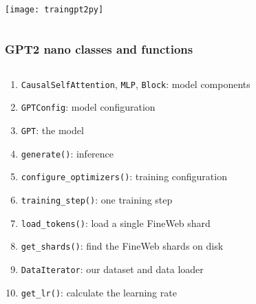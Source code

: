 \documentclass[
	notes=none,
	aspectratio=169
]{beamer}
\begin{document}

\begin{frame}
\frametitle{}

\begin{columns}[T]
\begin{column}[T]{1.0\textwidth}
\setlength{\parskip}{0.5em}

\vspace{0.0cm}
\texttt{[image: traingpt2py]}


\end{column}
\end{columns}

\end{frame}
\note{
}


\begin{frame}
\frametitle{GPT2 nano classes and functions}

\begin{columns}[T]
\begin{column}[T]{1.0\textwidth}
\setlength{\parskip}{0.5em}

\vspace{0.0cm}
\begin{enumerate}
\setlength{\parskip}{0.0em}
\item {\tt CausalSelfAttention}, {\tt MLP}, {\tt Block}: model components
\item {\tt GPTConfig}: model configuration
\item {\tt GPT}: the model
\item {\tt generate()}: inference
\item {\tt configure\_optimizers()}: training configuration
\item {\tt training\_step()}: one training step
\item {\tt load\_tokens()}: load a single FineWeb shard
\item {\tt get\_shards()}: find the FineWeb shards on disk
\item {\tt DataIterator}: our dataset and data loader
\item {\tt get\_lr()}: calculate the learning rate
\end{enumerate}

\end{column}
\end{columns}

\end{frame}
\note{
}
\end{document}
